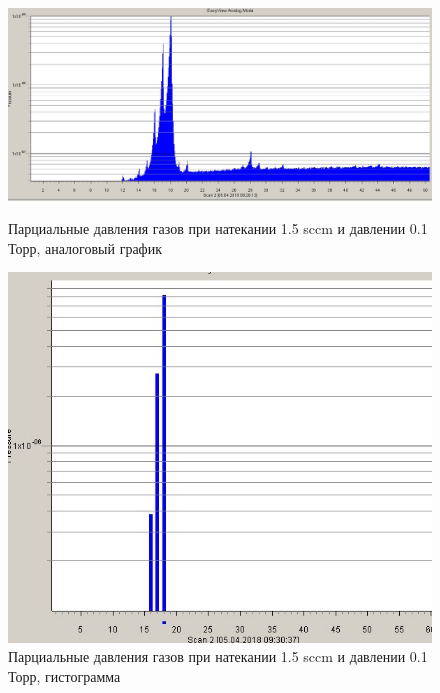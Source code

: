 \documentclass[a4paper]{article}
\begin{document}
\begin{figure}[h]
\begin{center}
\begin{minipage}[h]{0.5\linewidth}
\includegraphics[width=1\linewidth]{flow1,5analog.jpg}
\caption{Парциальные давления газов при натекании 1.5 sccm и давлении 0.1 Торр, аналоговый график  } %
\end{minipage}
\hfill 
\begin{minipage}[h]{0.4\linewidth}
\includegraphics[width=1\linewidth]{flow2gisto.jpg}
\caption{Парциальные давления газов при натекании 1.5 sccm и давлении 0.1 Торр, гистограмма  }
\label{ris:experimcoded}
\end{minipage}
\end{center}
\end{figure}
\end{document}

